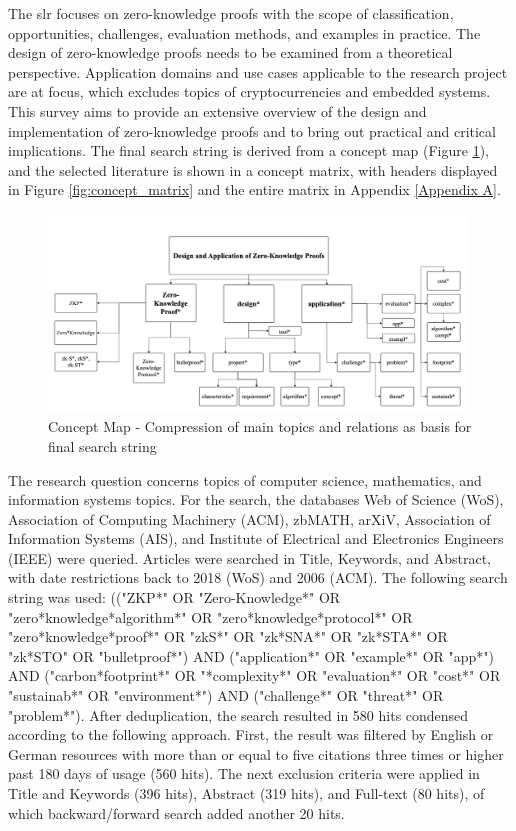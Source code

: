 The \acrshort{slr} focuses on zero-knowledge proofs with the scope of classification, opportunities, challenges, evaluation methods, and examples in practice. The design of zero-knowledge proofs needs to be examined from a theoretical perspective. Application domains and use cases applicable to the research project are at focus, which excludes topics of cryptocurrencies and embedded systems. This survey aims to provide an extensive overview of the design and implementation of zero-knowledge proofs and to bring out practical and critical implications. The final search string is derived from a concept map (Figure \ref{fig:con_map}), and the selected literature is shown in a concept matrix, with headers displayed in Figure \ref{fig:concept_matrix} and the entire matrix in Appendix \ref{Appendix A}.

\begin{figure}[hbt]
	\centering
	\includegraphics[width=0.99\textwidth]{Pictures/con_map.png}
	\caption{Concept Map - Compression of main topics and relations as basis for final search string}
	\label{fig:con_map}
\end{figure}

The research question concerns topics of computer science, mathematics, and information systems topics. For the search, the databases Web of Science (WoS), Association of Computing Machinery (ACM), zbMATH, arXiV, Association of Information Systems (AIS), and Institute of Electrical and Electronics Engineers (IEEE) were queried. Articles were searched in Title, Keywords, and Abstract, with date restrictions back to 2018 (WoS) and 2006 (ACM). The following search string was used: (("ZKP*" OR "Zero-Knowledge*" OR "zero*knowledge*algorithm*" OR "zero*knowledge*protocol*" OR "zero*knowledge*proof*" OR "zkS*" OR "zk*SNA*" OR "zk*STA*" OR "zk*STO" OR "bulletproof*") AND ("application*" OR "example*" OR "app*") AND ("carbon*footprint*" OR "*complexity*" OR "evaluation*" OR "cost*" OR "sustainab*" OR "environment*") AND ("challenge*" OR "threat*" OR "problem*"). After deduplication, the search resulted in 580 hits condensed according to the following approach. First, the result was filtered by English or German resources with more than or equal to five citations three times or higher past 180 days of usage (560 hits). The next exclusion criteria were applied in Title and Keywords (396 hits), Abstract (319 hits), and Full-text (80 hits), of which backward/forward search added another 20 hits. 

